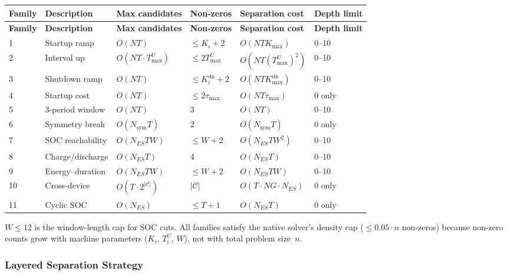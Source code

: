 \begin{longtable}{llllll}
\toprule
\textbf{Family} & \textbf{Description} & \textbf{Max candidates} &
  \textbf{Non-zeros} & \textbf{Separation cost} & \textbf{Depth limit} \\
\midrule
\endfirsthead
\toprule
\textbf{Family} & \textbf{Description} & \textbf{Max candidates} &
  \textbf{Non-zeros} & \textbf{Separation cost} & \textbf{Depth limit} \\
\midrule
\endhead
1 & Startup ramp   & $O(NT)$        & $\leq K_i{+}2$        & $O(NTK_{\max})$     & 0--10 \\
2 & Interval up    & $O(NT\cdot T^U_{\max})$ & $\leq 2T^U_{\max}$ & $O(NT(T^U_{\max})^2)$ & 0--10 \\
3 & Shutdown ramp  & $O(NT)$        & $\leq K_i^{\mathrm{dn}}{+}2$ & $O(NTK^{\mathrm{dn}}_{\max})$ & 0--10 \\
4 & Startup cost   & $O(NT)$        & $\leq 2\tau_{\max}$   & $O(NT\tau_{\max})$  & 0 only \\
5 & 3-period window & $O(NT)$       & 3                     & $O(NT)$             & 0--10 \\
6 & Symmetry break & $O(N_{\mathrm{sym}}T)$ & 2          & $O(N_{\mathrm{sym}}T)$ & 0 only \\
\midrule
7 & SOC reachability & $O(N_{ES}TW)$ & $\leq W{+}2$         & $O(N_{ES}TW^2)$     & 0--10 \\
8 & Charge/discharge & $O(N_{ES}T)$  & 4                    & $O(N_{ES}T)$        & 0--10 \\
9 & Energy--duration & $O(N_{ES}TW)$ & $\leq W{+}2$         & $O(N_{ES}TW)$       & 0--10 \\
10 & Cross-device   & $O(T\cdot 2^{|\mathcal{C}|})$ & $|\mathcal{C}|$  & $O(T\cdot NG\cdot N_{ES})$ & 0 only \\
11 & Cyclic SOC     & $O(N_{ES})$   & $\leq T{+}1$          & $O(N_{ES}T)$        & 0 only \\
\bottomrule
\end{longtable}

$W \leq 12$ is the window-length cap for SOC cuts.  All families satisfy the
native solver's density cap ($\leq 0.05 \cdot n$ non-zeros) because non-zero
counts grow with machine parameters ($K_i$, $T^U_i$, $W$), not with total
problem size~$n$.

\subsubsection{Layered Separation Strategy}
\label{sec:cut-strategy}

